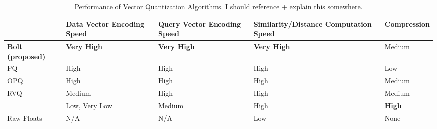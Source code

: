 
\newcommand{\splitablecell}[2][c]{%
  \begin{tabular}[#1]{@{}c@{}}#2\end{tabular}}

\begin{table*}[t]
  \caption{Performance of Vector Quantization Algorithms. I should reference + explain this somewhere.}
  \label{tab:table1}
  \large

  \def\arraystretch{1.1}%
  \begin{tabularx}{\linewidth}{X|YYYY}
\toprule
    & \hspace{1mm} Data Vector \hphantom{ } Encoding Speed & Query Vector Encoding Speed & Similarity/Distance Computation Speed & \vspace{.5mm} Compression \\
\hline
    \textbf{Bolt (proposed)} & \textbf{Very High} & \textbf{Very High} & \textbf{Very High} & Medium \\
    PQ  & High & High & High & Low \\
    OPQ & High & High & High & Medium \\
    RVQ & Medium & High & High & Medium \\
     & Low, Very Low & Medium & High & \textbf{High} \\
    Raw Floats & N/A & N/A & Low & None \\


\end{tabularx}
\end{table*}
